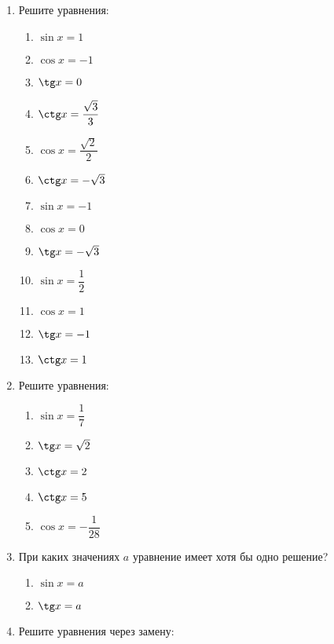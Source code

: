 \documentclass[12pt, a4paper]{article}
\begin{document}
	
	\begin{enumerate}
		\item Решите уравнения:
		\begin{multicols}{2}
			\begin{enumerate}[label=\asbuk*)]
			\item $\sin x=1$
			\item $\cos x=-1$
			\item $\tg x=0$
			\item $\ctg x=\dfrac{\sqrt{3}}{3}$
			\item $\cos x=\dfrac{\sqrt{2}}{2}$
			\item $\ctg x=-\sqrt{3}$ 
			\item $\sin x=-1$
			\item $\cos x=0$
			\item $\tg x=-\sqrt{3}$
			\item $\sin x=\dfrac{1}{2}$
			\item $\cos x=1$
			\item $\tg x=-1$
			\item $\ctg x=1$
		\end{enumerate}
		\end{multicols}
	\item Решите уравнения:
	\begin{multicols}{2}
		\begin{enumerate}[label=\asbuk*)]
			\item $\sin x=\dfrac{1}{7}$
			\item $\tg x=\sqrt{2}$
			\item $\ctg x=2$
			\item $\ctg x=5$
			\item $\cos x=-\dfrac{1}{28}$
		\end{enumerate}
	\end{multicols}
		\item При каких значениях $a$ уравнение имеет хотя бы одно решение?
		\begin{multicols}{2}
			\begin{enumerate}[label=\asbuk*)]
				\item $\sin x=a$
				\item $\tg x=a$
			\end{enumerate}
		\end{multicols}
	\item Решите уравнения через замену:
	\begin{multicols}{2}
		\begin{enumerate}[label=\asbuk*)]

\end{enumerate}
\end{multicols}
\end{enumerate}
\end{document}
